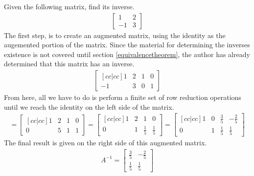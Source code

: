 \begin{exmp}
    Given the following matrix, find its inverse.
    \begin{align*}
        \begin{bmatrix}
            1 & 2  \\
            -1 & 3  
        \end{bmatrix}
    \end{align*}
    The first step, is to create an augmented matrix, using the identity as the
    augemented portion of the matrix. Since the material for determining the
    inverses existence is not covered until section \ref{equivalencetheorem},
    the author has already determined that this matrix has an inverse. 
    \begin{align*}
        \begin{bmatrix}[cc|cc]
            1 & 2 & 1 & 0 \\
            -1 & 3 & 0 & 1 
        \end{bmatrix}
    \end{align*}
    From here, all we have to do is perform a finite set of row reduction
    operations until we reach the identity on the left side of the matrix.
    \begin{align*}
        =\begin{bmatrix}[cc|cc]
            1 & 2 & 1 & 0 \\
            0 & 5 & 1 & 1 
        \end{bmatrix}
        =\begin{bmatrix}[cc|cc]
            1 & 2 & 1 & 0 \\
            0 & 1 & \frac{1}{5} & \frac{1}{5}
        \end{bmatrix}
        =\begin{bmatrix}[cc|cc]
            1 & 0 & \frac{3}{5} & -\frac{2}{5} \\
            0 & 1 & \frac{1}{5} & \frac{1}{5}
        \end{bmatrix}
    \end{align*}
    The final result is given on the right side of this augmented matrix. 
    \begin{align*}
        A^{-1}=
        \begin{bmatrix}
            \frac{3}{5} & -\frac{2}{5} \\
            \frac{1}{5} & \frac{1}{5}
        \end{bmatrix}
    \end{align*}

\end{exmp}
